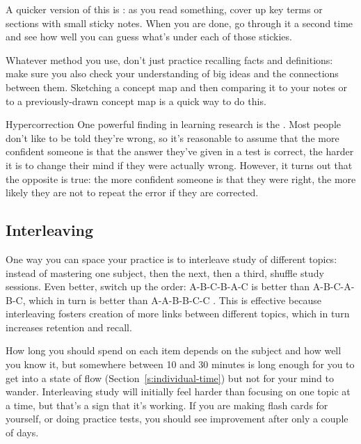A quicker version of this is
: as you read something,
cover up key terms or sections with small sticky notes. When you are
done, go through it a second time and see how well you can guess
what's under each of those stickies.

Whatever method you use, don't just practice recalling facts and
definitions: make sure you also check your understanding of big ideas
and the connections between them. Sketching a concept map and then
comparing it to your notes or to a previously-drawn concept map is a
quick way to do this.

\begin{aside}{Hypercorrection}
  One powerful finding in learning research is the  \cite{Metc2016}. Most people don't
  like to be told they're wrong, so it's reasonable to assume that the
  more confident someone is that the answer they've given in a test is
  correct, the harder it is to change their mind if they were actually
  wrong. However, it turns out that the opposite is true: the more
  confident someone is that they were right, the more likely they are
  not to repeat the error if they are corrected.
\end{aside}

\subsection{Interleaving}\label{interleaving}

One way you can space your practice is to interleave study of different
topics: instead of mastering one subject, then the next, then a third,
shuffle study sessions. Even better, switch up the order: A-B-C-B-A-C is
better than A-B-C-A-B-C, which in turn is better than A-A-B-B-C-C
\cite{Rohrer2015}. This is effective because interleaving fosters
creation of more links between different topics, which in turn increases
retention and recall.

How long you should spend on each item depends on the subject and how
well you know it, but somewhere between 10 and 30 minutes is long enough
for you to get into a state of flow (Section~\ref{s:individual-time}) but
not for your mind to wander. Interleaving study will initially feel
harder than focusing on one topic at a time, but that's a sign that it's
working. If you are making flash cards for yourself, or doing practice
tests, you should see improvement after only a couple of days.

